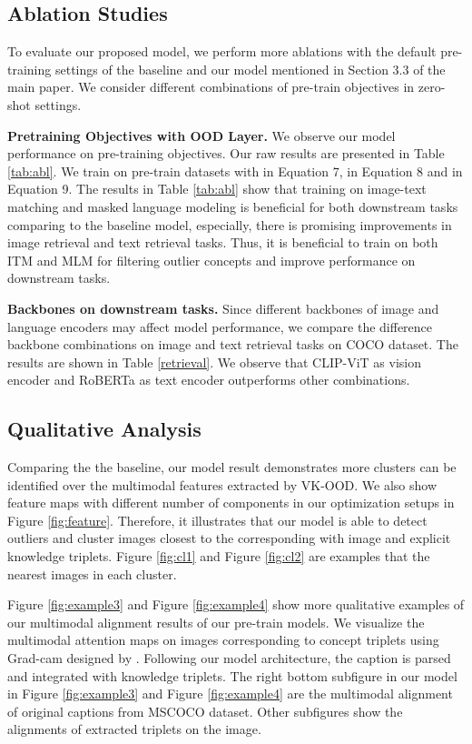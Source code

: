 \documentclass{article}
\begin{document}
\subsection{Ablation Studies} \label{ap:ablation}
To evaluate our proposed model, we perform more ablations with the default pre-training settings of the baseline and our model mentioned in Section 3.3 of the main paper. We consider different combinations of pre-train objectives in zero-shot settings.   



{\bf Pretraining Objectives with OOD Layer.} We observe our model performance on pre-training objectives. Our raw results are presented in Table \ref{tab:abl}. We train on pre-train datasets with  in Equation 7,  in Equation 8 and  in Equation 9. The results in Table \ref{tab:abl} show that training on image-text matching and masked language modeling is beneficial for both downstream tasks comparing to the baseline model, especially, there is promising improvements in image retrieval and text retrieval tasks. Thus, it is beneficial to train on both ITM and MLM for filtering outlier concepts and improve performance on downstream tasks. 

{\bf Backbones on downstream tasks.} Since different backbones of image and language encoders may affect model performance, we compare the difference backbone combinations on image and text retrieval tasks on COCO dataset. The results are shown in Table \ref{retrieval}. We observe that CLIP-ViT as vision encoder and RoBERTa as text encoder outperforms other combinations. 

\subsection{Qualitative Analysis} \label{ap:qa}

Comparing the the baseline, our model result demonstrates more clusters can be identified over the multimodal features extracted by VK-OOD. We also show feature maps with different number of components in our optimization setups in Figure \ref{fig:feature}. Therefore, it illustrates that our model is able to detect outliers and cluster images closest to the corresponding  with image and explicit knowledge triplets. Figure \ref{fig:cl1} and Figure \ref{fig:cl2} are examples that the nearest images in each cluster.



Figure \ref{fig:example3} and Figure \ref{fig:example4} show more qualitative examples of our multimodal alignment results of our pre-train models. We visualize the multimodal attention maps on images corresponding to concept triplets using Grad-cam designed by \cite{selvaraju2017grad}. Following our model architecture, the caption is parsed and integrated with knowledge triplets. The right bottom subfigure in our model in Figure \ref{fig:example3} and Figure \ref{fig:example4} are the multimodal alignment of original captions from MSCOCO \cite{lin2014microsoft} dataset. Other subfigures show the alignments of extracted triplets on the image.
\end{document}
